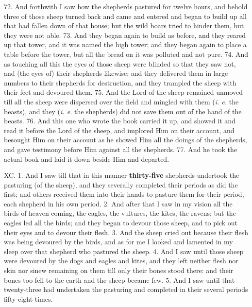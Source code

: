 72. And forthwith I saw how the shepherds pastured
for twelve hours, and behold three of those sheep
turned back and came and entered and began to
build up all that had fallen down of that house; but
the wild boars tried to hinder them, but they were
not able. 73. And they began again to build as
before, and they reared up that tower, and it was
named the high tower; and they began again to
place a table before the tower, but all the bread on it
was polluted and not pure. 74. And as touching
all this the eyes of those sheep were blinded so that
they saw not, and (the eyes of) their shepherds likewise;
and they delivered them in large numbers to
their shepherds for destruction, and they trampled the
sheep with their feet and devoured them. 75. And
the Lord of the sheep remained unmoved till all the
sheep were dispersed over the field and mingled with
them (\emph{i. e.} the beasts), and they (\emph{i. e.} the shepherds)
did not save them out of the hand of the beasts.
76. And this one who wrote the book carried it up,
and showed it and read it before the Lord of the
sheep, and implored Him on their account, and
besought Him on their account as he showed Him all
the doings of the shepherds, and gave testimony before
Him against all the shepherds. 77. And he took the
actual book and laid it down beside Him and departed.


XC. 1. And I saw till that in this manner \textbf{thirty-five}
shepherds undertook the pasturing (of the
sheep), and they severally completed their periods
as did the first; and others received them into their
hands to pasture them for their period, each shepherd
in his own period. 2. And after that I saw in my
vision all the birds of heaven coming, the eagles, the
vultures, the kites, the ravens; but the eagles led
all the birds; and they began to devour those sheep,
and to pick out their eyes and to devour their flesh.
3. And the sheep cried out because their flesh was
being devoured by the birds, and as for me I looked
and lamented in my sleep over that shepherd who
pastured the sheep. 4. And I saw until those sheep
were devoured by the dogs and eagles and kites, and
they left neither flesh nor skin nor sinew remaining
on them till only their bones stood there: and their
bones too fell to the earth and the sheep became few.
5. And I saw until that twenty-three had undertaken
the pasturing and completed in their several periods
fifty-eight times.

